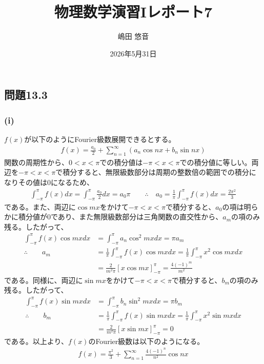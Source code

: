 \documentclass[platex,dvipdfmx,a4paper]{jsarticle}
\title{物理数学演習Iレポート7}
\author{嶋田 悠音}
\date{2026年5月31日}
\begin{document}
  \maketitle
  \subsection*{問題13.3}
  \subsubsection*{(i)}
  $f(x)$が以下のようにFourier級数展開できるとする。
  \begin{align*}
    f(x)=\frac{a_0}{2}+\sum_{n=1}^\infty \left(a_n \cos nx + b_n \sin nx\right)
  \end{align*}
  関数の周期性から、$0<x<\pi$での積分値は$-\pi<x<\pi$での積分値に等しい。両辺を$-\pi<x<\pi$で積分すると、無限級数部分は周期の整数倍の範囲での積分になりその値は0になるため、
  \begin{align*}
    \int_{-\pi}^{\pi} f(x)dx=\int_{-\pi}^\pi \frac{a_0}{2}dx=a_0\pi \qquad \therefore \quad a_0=\frac{1}{\pi}\int_{-\pi}^\pi f(x)dx=\frac{2{\pi}^2}{3}
  \end{align*}
  である。また、両辺に$\cos{mx}$をかけて$-\pi<x<\pi$で積分すると、$a_0$の項は明らかに積分値が0であり、また無限級数部分は三角関数の直交性から、$a_m$の項のみ残る。したがって、
  \begin{align*}
    \int_{-\pi}^{\pi} f(x)\cos{mx}dx &= \int_{-\pi}^{\pi} a_n\cos^2{mx}dx = \pi a_m\\
    \therefore \qquad a_m &= \frac{1}{\pi}\int_{-\pi}^{\pi} f(x)\cos{mx}dx = \frac{1}{\pi}\int_{-\pi}^{\pi} x^2 \cos{mx}dx\\
    &= \frac{2}{m^2\pi}\left[x\cos{mx}\right]_{-\pi}^{\pi} = \frac{4(-1)^m}{m^2}
  \end{align*}
  である。同様に、両辺に$\sin{mx}$をかけて$-\pi<x<\pi$で積分すると、$b_m$の項のみ残る。したがって、
  \begin{align*}
    \int_{-\pi}^{\pi} f(x)\sin{mx}dx &= \int_{-\pi}^{\pi} b_n\sin^2{mx}dx = \pi b_m\\
    \therefore \qquad b_m &= \frac{1}{\pi}\int_{-\pi}^{\pi} f(x)\sin{mx}dx = \frac{1}{\pi}\int_{-\pi}^{\pi} x^2 \sin{mx}dx\\
    &= \frac{2}{m^2\pi}\left[x\sin{mx}\right]_{-\pi}^{\pi} = 0
  \end{align*}
  である。以上より、$f(x)$のFourier級数は以下のようになる。
  \begin{align*}
    f(x)=\frac{\pi^2}{3}+\sum_{n=1}^\infty \frac{4(-1)^n}{n^2}\cos{nx}
  \end{align*} 
\end{document}

